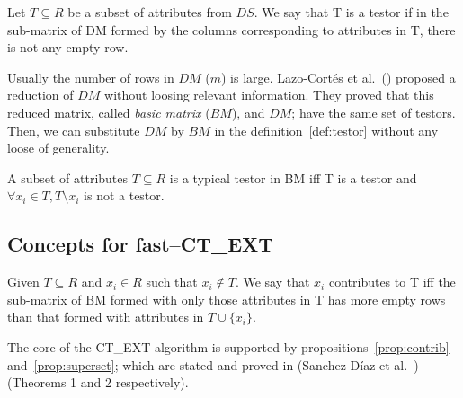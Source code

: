 \documentclass[citeauthoryear]{llncs}
\begin{document}
	\begin{definition}\label{def:testor}
		Let $T \subseteq R$ be a subset of attributes from $DS$. We say that T is a testor if in the sub-matrix
		of DM formed by the columns corresponding to attributes in T, there is not any empty row.
	\end{definition}
	
	
	Usually the number of rows in $DM$ ($m$) is large. Lazo-Cort\'es et al.~(\cite{Lazo2001}) proposed a reduction of $DM$ without loosing relevant information. They proved that this reduced matrix, called \textit{basic matrix} ($BM$), and $DM$; have the same set of testors. Then, we can substitute $DM$ by $BM$ in the definition~\ref{def:testor} without any loose of generality. 
	
	
	
	\begin{definition}\label{def:TT}
		A subset of attributes $T \subseteq R$ is a typical testor in BM iff T is a testor and $\forall x_i \in T, T \setminus x_i$ is not a testor. 
	\end{definition}
		
%	
\subsection{Concepts for fast--CT\_EXT}
%
		
	\begin{definition}\label{def:contrib}
		Given $T \subseteq R$ and $x_i \in R$ such that $x_i \notin T$. We say that $x_i$ contributes to T iff the sub-matrix of BM formed with only those attributes in T has more empty rows than that formed with attributes in $T \cup \lbrace x_i \rbrace$.
	\end{definition}	
	
	The core of the CT\_EXT algorithm is supported by propositions~\ref{prop:contrib} and~\ref{prop:superset}; which are stated and proved in (Sanchez-D\'iaz et al.~\cite{Sanchez2010}) (Theorems 1 and 2 respectively).
	
\end{document}
